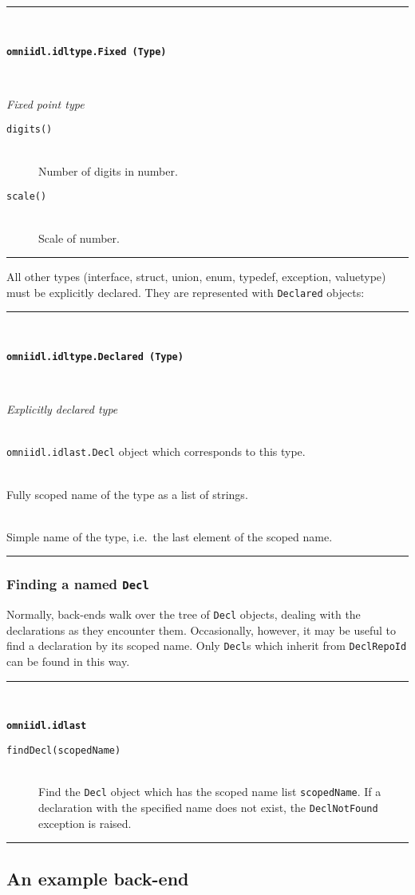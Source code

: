 \documentclass[11pt,twoside,a4paper]{article}
\newcommand{\func}[1]{\texttt{#1}}
\newcommand{\var}[1]{\texttt{#1}}
\newcommand{\class}[1]{\texttt{#1}}
\newcommand{\dfunc}[1]{\item[\func{#1}]\mbox{}\\}
\newenvironment{funcdesc}[1]%
  {\vspace{\baselineskip}%
   \noindent\begin{minipage}{\textwidth}%
   \noindent\rule{\textwidth}{1.5pt}\\%
   \centerline{\textbf{\texttt{#1}}}%
   \vspace{-.5\baselineskip}%
   \begin{description}}
  {\vspace{-\baselineskip}\end{description}%
   \noindent\rule{\textwidth}{1.5pt}\end{minipage}}
\newenvironment{classdesc}[2]%
  {\vspace{\baselineskip}%
   \noindent\begin{minipage}{\textwidth}%
   \noindent\rule{\textwidth}{1.5pt}\\%
   \centerline{\textbf{\texttt{#1}}}\\%
   \centerline{\textit{#2}}%
   \vspace{-.5\baselineskip}%
   \begin{description}}
  {\vspace{-\baselineskip}\end{description}%
   \noindent\rule{\textwidth}{1.5pt}\end{minipage}}
\begin{document}
\begin{classdesc}
  {omniidl.idltype.Fixed (Type)}
  {Fixed point type}

\dfunc{digits()}
  Number of digits in number.

\dfunc{scale()}
  Scale of number.

\end{classdesc}

\vspace{\baselineskip}

\noindent
All other types (interface, struct, union, enum, typedef, exception,
valuetype) must be explicitly declared. They are represented with
\class{Declared} objects:

\begin{classdesc}
  {omniidl.idltype.Declared (Type)}
  {Explicitly declared type}
  \label{cls:typeDeclared}

\dfunc{decl()}
  \class{omniidl.idlast.Decl} object which corresponds to this type.

\dfunc{scopedName()}
  Fully scoped name of the type as a list of strings.

\dfunc{name()}
  Simple name of the type, i.e.\ the last element of the scoped name.

\end{classdesc}



\subsubsection{Finding a named \class{Decl}}

Normally, back-ends walk over the tree of \class{Decl} objects,
dealing with the declarations as they encounter them. Occasionally,
however, it may be useful to find a declaration by its scoped name.
Only \class{Decl}s which inherit from \class{DeclRepoId} can be found
in this way.

\begin{funcdesc}{omniidl.idlast}

\dfunc{findDecl(scopedName)}
  Find the \class{Decl} object which has the scoped name list
  \var{scopedName}. If a declaration with the specified name does not
  exist, the \class{DeclNotFound} exception is raised.

\end{funcdesc}



\subsection{An example back-end}
\end{document}
